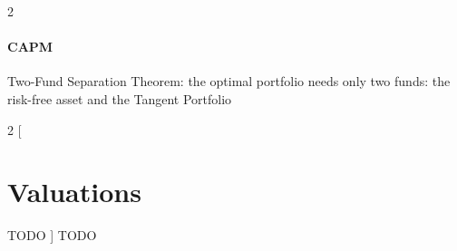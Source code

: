 \documentclass[9pt]{article}
\begin{document}
\begin{multicols}{2}
\paragraph{CAPM}
Two-Fund Separation Theorem: the optimal portfolio needs only two funds: the risk-free asset and the Tangent Portfolio


\end{multicols}


\begin{multicols}{2}
[
\section{Valuations}
TODO
]
TODO
\end{multicols}
\end{document}
